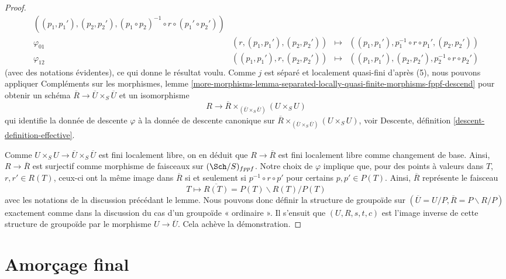 \begin{proof}
$$\begin{matrix}
((p_1, p_1'), (p_2, p_2'),
(p_1 \circ p_2)^{-1} \circ r \circ (p_1' \circ p_2')) \\
\varphi_{01} & (r, (p_1, p_1'), (p_2, p_2')) & \mapsto &
((p_1, p_1'), p_1^{-1} \circ r \circ p_1', (p_2, p_2')) \\
\varphi_{12} & ((p_1, p_1'), r, (p_2, p_2')) & \mapsto &
((p_1, p_1'), (p_2, p_2'), p_2^{-1} \circ r \circ p_2')
\end{matrix}
$$
(avec des notations évidentes), ce qui donne le résultat voulu.
Comme $j$ est séparé et localement quasi-fini d'après (5), nous pouvons appliquer
Compléments sur les morphismes, lemme
\ref{more-morphisms-lemma-separated-locally-quasi-finite-morphisms-fppf-descend}
pour obtenir un schéma $\overline{R} \to \overline{U} \times_S \overline{U}$
et un isomorphisme
$$
R \to \overline{R} \times_{(\overline{U} \times_S \overline{U})} (U \times_S U)
$$
qui identifie la donnée de descente $\varphi$ à la donnée de descente
canonique sur
$\overline{R} \times_{(\overline{U} \times_S \overline{U})} (U \times_S U)$,
voir
Descente, définition \ref{descent-definition-effective}.

\medskip\noindent
Comme $U \times_S U \to \overline{U} \times_S \overline{U}$ est fini
localement libre, on en déduit que $R \to \overline{R}$ est fini localement libre
comme changement de base. Ainsi, $R \to \overline{R}$ est surjectif comme morphisme de
faisceaux sur $(\Sch/S)_{fppf}$.
Notre choix de $\varphi$ implique que, pour des points à valeurs dans $T$, $r, r' \in R(T)$,
ceux-ci ont la même image dans $\overline{R}$ si et seulement si
$p^{-1} \circ r \circ p'$ pour certains $p, p' \in P(T)$. Ainsi,
$\overline{R}$ représente le faisceau
$$
T \longmapsto  \overline{R(T)} = P(T)\backslash R(T)/P(T)
$$
avec les notations de la discussion précédant le lemme.
Nous pouvons donc définir la structure de groupoïde sur
$(\overline{U} = U/P, \overline{R} = P\backslash R/P)$ exactement comme dans
la discussion du cas d'un groupoïde « ordinaire ».
Il s'ensuit que $(U, R, s, t, c)$ est l'image inverse de
cette structure de groupoïde par le morphisme $U \to \overline{U}$.
Cela achève la démonstration.
\end{proof}















\section{Amorçage final}
\label{section-final-bootstrap}

